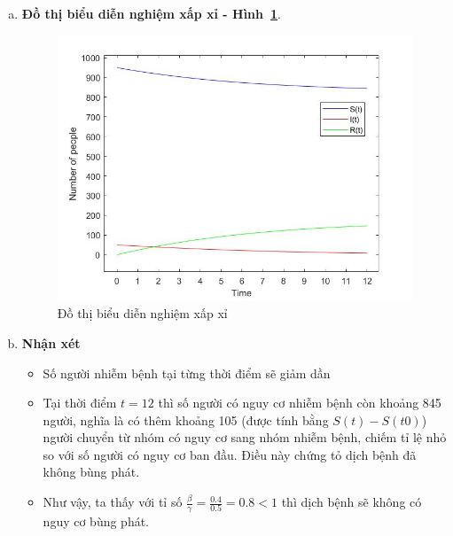\begin{enumerate}[a)]
\item \textbf{Đồ thị biểu diễn nghiệm xấp xỉ - Hình~\ref{Fig:vd1}}.
	\begin{figure}[h!]
		\begin{center}
		\includegraphics[scale=0.5]{Images/baitoan2/p1.jpg}
		\end{center}
		\caption{Đồ thị biểu diễn nghiệm xấp xỉ }\label{Fig:vd1}
	\end{figure}

\item \textbf{Nhận xét}
	\begin{itemize}
		\item Số người nhiễm bệnh tại từng thời điểm sẽ giảm dần
		\item Tại thời điểm $ t = 12 $ thì số người có nguy cơ nhiễm bệnh còn khoảng 845 người, nghĩa là có thêm khoảng 105 (được tính bằng $ S(t)-S(t0) $) người chuyển từ nhóm có nguy cơ sang nhóm nhiễm bệnh, chiếm tỉ lệ nhỏ so với số người có nguy cơ ban đầu. Điều này chứng tỏ dịch bệnh đã không bùng phát.
		\item Như vậy, ta thấy với  tỉ số $ \frac{\beta}{\gamma} = \frac{0.4}{0.5} = 0.8 <1$  thì dịch bệnh sẽ không có nguy cơ bùng phát. 
	\end{itemize}
\end{enumerate}

